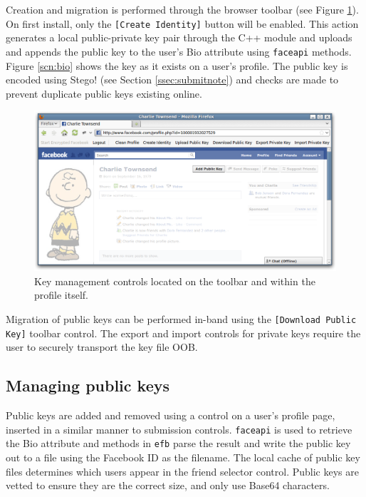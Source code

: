 Creation and migration is performed through the browser toolbar (see Figure \ref{scn:pubkey}). On first install, only the {\tt [Create Identity]} button will be enabled. This action generates a local public-private key pair through the C++ module and uploads and appends the public key to the user's Bio attribute using {\tt faceapi} methods. Figure \ref{scn:bio} shows the key as it exists on a user's profile. The public key is encoded using Stego! (see Section \ref{ssec:submitnote}) and checks are made to prevent duplicate public keys existing online.

    \begin{figure}[tbph]
        \begin{center}
        
                \includegraphics[width=12cm]{screens/pubkey.png}

            \caption{Key management controls located on the toolbar and within the profile itself.}
            \label{scn:pubkey}
        \end{center}
    \end{figure}

Migration of public keys can be performed in-band using the {\tt [Download Public Key]} toolbar control. The export and import controls for private keys require the user to securely transport the key file OOB.

    
\subsection{Managing public keys}
\label{ssec:mankeys}

Public keys are added and removed using a control on a user's profile page, inserted in a similar manner to submission controls. {\tt faceapi} is used to retrieve the Bio attribute and methods in {\tt efb} parse the result and write the public key out to a file using the Facebook ID as the filename. The local cache of public key files determines which users appear in the friend selector control. Public keys are vetted to ensure they are the correct size, and only use Base64 characters.
    
